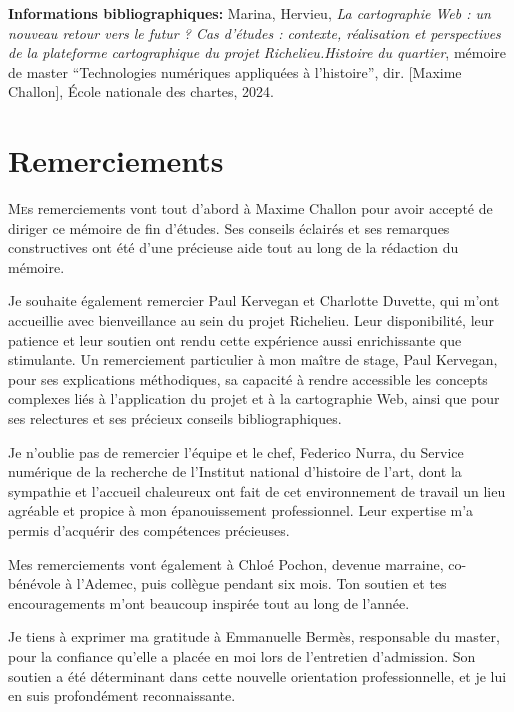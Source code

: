 \documentclass[openany, a4paper, 12pt, twoside]{book}
\begin{document}
\medskip

\textbf{Informations bibliographiques:} Marina, Hervieu, \textit{La cartographie Web : un nouveau retour vers le futur ? Cas d'études : contexte, réalisation et perspectives de la plateforme cartographique du projet Richelieu.Histoire du quartier}, mémoire de master \enquote{Technologies numériques appliquées à l'histoire}, dir. [Maxime Challon], École nationale des chartes, 2024.
	
\newpage{\pagestyle{empty}\cleardoublepage}

\chapter*{Remerciements}
	
\lettrine{M}es remerciements vont tout d'abord à Maxime Challon pour avoir accepté de diriger ce mémoire de fin d'études. Ses conseils éclairés et ses remarques constructives ont été d'une précieuse aide tout au long de la rédaction du mémoire. 

Je souhaite également remercier Paul Kervegan et Charlotte Duvette, qui m'ont accueillie avec bienveillance au sein du projet Richelieu. Leur disponibilité, leur patience et leur soutien ont rendu cette expérience aussi enrichissante que stimulante. Un remerciement particulier à mon maître de stage, Paul Kervegan, pour ses explications méthodiques, sa capacité à rendre accessible les concepts complexes liés à l’application du projet et à la cartographie Web, ainsi que pour ses relectures et ses précieux conseils bibliographiques.

Je n’oublie pas de remercier l’équipe et le chef, Federico Nurra, du Service numérique de la recherche de l’Institut national d’histoire de l’art, dont la sympathie et l’accueil chaleureux ont fait de cet environnement de travail un lieu agréable et propice à mon épanouissement professionnel. Leur expertise m’a permis d’acquérir des compétences précieuses.

Mes remerciements vont également à Chloé Pochon, devenue marraine, co-bénévole à l’Ademec, puis collègue pendant six mois. Ton soutien et tes encouragements m'ont beaucoup inspirée tout au long de l’année. 

Je tiens à exprimer ma gratitude à Emmanuelle Bermès, responsable du master, pour la confiance qu’elle a placée en moi lors de l'entretien d’admission. Son soutien a été déterminant dans cette nouvelle orientation professionnelle, et je lui en suis profondément reconnaissante.
\end{document}
